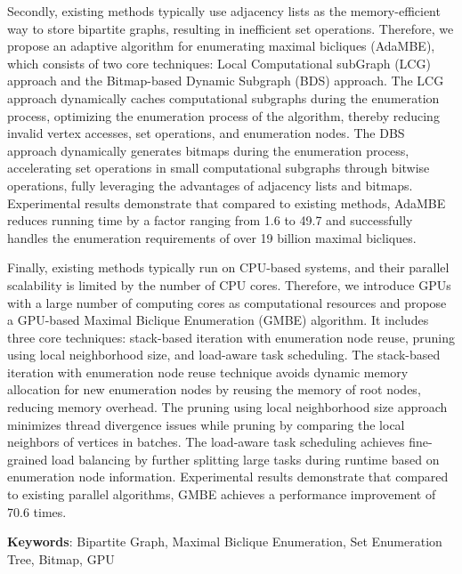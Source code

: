 Secondly, existing methods typically use adjacency lists as the memory-efficient way to store bipartite graphs, resulting in inefficient set operations. 
Therefore, we propose an adaptive algorithm for enumerating maximal bicliques (AdaMBE), which consists of two core techniques: Local Computational subGraph (LCG) approach and the Bitmap-based Dynamic Subgraph (BDS) approach. The LCG approach dynamically caches computational subgraphs during the enumeration process, optimizing the enumeration process of the algorithm, thereby reducing invalid vertex accesses, set operations, and enumeration nodes. The DBS approach dynamically generates bitmaps during the enumeration process, accelerating set operations in small computational subgraphs through bitwise operations, fully leveraging the advantages of adjacency lists and bitmaps. Experimental results demonstrate that compared to existing methods, AdaMBE reduces running time by a factor ranging from 1.6 to 49.7 and successfully handles the enumeration requirements of over 19 billion maximal bicliques.


Finally, existing methods typically run on CPU-based systems, and their parallel scalability is limited by the number of CPU cores. Therefore, we introduce GPUs with a large number of computing cores as computational resources and propose a GPU-based Maximal Biclique Enumeration (GMBE) algorithm. It includes three core techniques: stack-based iteration with enumeration node reuse, pruning using local neighborhood size, and load-aware task scheduling. The stack-based iteration with enumeration node reuse technique avoids dynamic memory allocation for new enumeration nodes by reusing the memory of root nodes, reducing memory overhead. The pruning using local neighborhood size approach minimizes thread divergence issues while pruning by comparing the local neighbors of vertices in batches. The load-aware task scheduling achieves fine-grained load balancing by further splitting large tasks during runtime based on enumeration node information. Experimental results demonstrate that compared to existing parallel algorithms, GMBE achieves a performance improvement of 70.6 times.

\vspace{\baselineskip}

\noindent \textbf{Keywords}: Bipartite Graph, Maximal Biclique Enumeration, Set Enumeration Tree, Bitmap, GPU